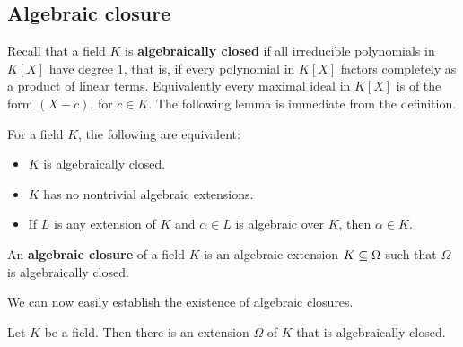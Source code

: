 \subsection{Algebraic closure}
Recall that a field $K$ is \textbf{algebraically closed} if all irreducible polynomials in $K[X]$ have degree $1$, that is, if every polynomial in $K[X]$ factors completely as a product of linear terms. Equivalently every maximal ideal in $K[X]$ is of the form $(X-c)$, for $c\in K$. The following lemma is immediate from the definition.
\begin{lemma}\label{field algebraically closed iff}
For a field $K$, the following are equivalent:
\begin{itemize}
\item $K$ is algebraically closed.
\item $K$ has no nontrivial algebraic extensions.
\item If $L$ is any extension of $K$ and $\alpha\in L$ is algebraic over $K$, then $\alpha\in K$.
\end{itemize}
\end{lemma}
\begin{definition}
An \textbf{algebraic closure} of a field $K$ is an algebraic extension $K\subseteq\Omega$ such that $\Omega$ is algebraically closed.
\end{definition}
We can now easily establish the existence of algebraic closures.
\begin{theorem}\label{field ext algebraically closed exist}
Let $K$ be a field. Then there is an extension $\Omega$ of $K$ that is
algebraically closed.
\end{theorem}
